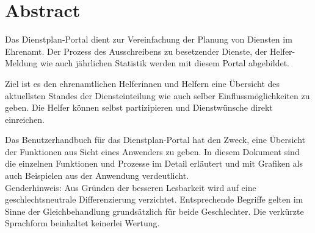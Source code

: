 \chapter*{Abstract} %

Das Dienstplan-Portal dient zur Vereinfachung der Planung von Diensten im Ehrenamt. Der Prozess des Ausschreibens zu besetzender Dienste, der Helfer-Meldung wie auch jährlichen Statistik werden mit diesem Portal abgebildet.

\vspace*{5mm} \noindent Ziel ist es den ehrenamtlichen Helferinnen und Helfern eine Übersicht des aktuellsten Standes der Diensteinteilung wie auch selber Einflussmöglichkeiten zu geben. Die Helfer können selbst  partizipieren und Dienstwünsche direkt einreichen. 

\vspace*{5mm} \noindent Das Benutzerhandbuch für das Dienstplan-Portal hat den Zweck, eine Übersicht der Funktionen aus Sicht eines Anwenders zu geben. In diesem Dokument sind die einzelnen Funktionen und Prozesse im Detail erläutert und mit Grafiken als auch Beispielen aus der Anwendung verdeutlicht. \\
Genderhinweis: Aus Gründen der besseren Lesbarkeit wird auf eine geschlechtsneutrale Differenzierung verzichtet. Entsprechende Begriffe gelten im Sinne der Gleichbehandlung grundsätzlich für beide Geschlechter. Die verkürzte Sprachform beinhaltet keinerlei Wertung.